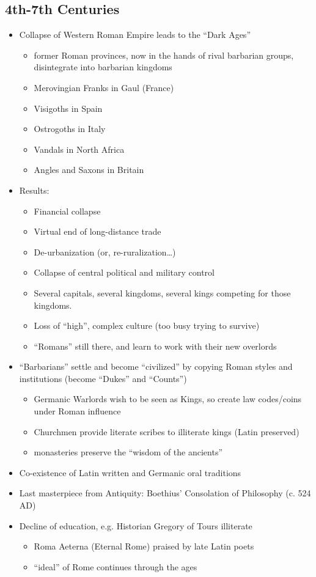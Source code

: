 \documentclass[12pt, twoside]{article}
\begin{document}
\subsection{4th-7th Centuries}
\begin{itemize}
\item Collapse of Western Roman Empire leads to the “Dark Ages”
	\begin{itemize}
	\item former Roman provinces, now in the hands of rival barbarian groups,   disintegrate into barbarian kingdoms
	\item Merovingian Franks in Gaul (France)
	\item Visigoths in Spain	
	\item Ostrogoths in Italy
	\item Vandals in North Africa
	\item Angles and Saxons in Britain
	\end{itemize}
\item Results:
	\begin{itemize}
	\item Financial collapse
	\item Virtual end of long-distance trade
	\item De-urbanization (or, re-ruralization…)
	\item Collapse of central political and military control
	\item Several capitals, several kingdoms, several kings competing for those kingdoms.
	\item Loss of “high”, complex culture (too busy trying to survive)
	\item “Romans” still there, and learn to work with their new overlords
	\end{itemize}
\item “Barbarians” settle and become “civilized” by copying Roman styles and institutions (become “Dukes” and “Counts”)
	\begin{itemize}
	\item Germanic Warlords wish to be seen as Kings, so create law codes/coins under Roman influence
	\item Churchmen provide literate scribes to illiterate kings (Latin preserved)
	\item monasteries preserve the “wisdom of the ancients”
	\end{itemize}
\item Co-existence of Latin written and Germanic oral traditions
\item Last masterpiece from Antiquity: Boethius’ Consolation of Philosophy (c. 524 AD)
\item Decline of education, e.g. Historian  Gregory of Tours illiterate
	\begin{itemize}
	\item Roma Aeterna (Eternal Rome) praised by late Latin poets
	\item “ideal” of Rome continues through the ages
	\end{itemize}
\end{itemize}
\end{document}
